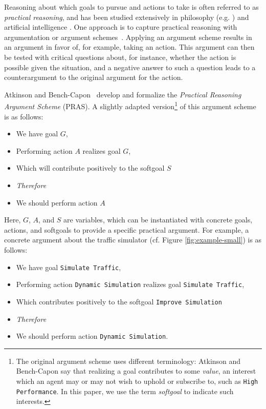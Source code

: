 Reasoning about which goals to pursue and actions to take is often referred to as \emph{practical reasoning}, and has been studied extensively in philosophy (e.g. \cite{Raz1978-RAZPR,walton1990}) and artificial intelligence \cite{bratman1987,atkinson2007}. One approach is to capture practical reasoning with argumentation or argument schemes~\cite{walton1990}. Applying an argument scheme results in an argument in favor of, for example, taking an action. This argument can then be tested with critical questions about, for instance, whether the action is possible given the situation, and a negative answer to such a question leads to a counterargument to the original argument for the action. 

Atkinson and Bench-Capon~\cite{atkinson2007} develop and formalize the \emph{Practical Reasoning Argument Scheme} (PRAS). A slightly adapted version\footnote{The original argument scheme uses different terminology: Atkinson and Bench-Capon say that realizing a goal contributes to some \emph{value}, an interest which an agent may or may not wish to uphold or subscribe to, such as \texttt{High Performance}. In this paper, we use the term \emph{softgoal} to indicate such interests.} of this argument scheme is as follows:

\begin{itemize}
\item[] We have goal $G$,
\item[] Performing action $A$ realizes goal $G$,
\item[] Which will contribute positively to the softgoal $S$
\item[] \textit{Therefore} 
\item[] We should perform action $A$
\end{itemize}

Here, $G$, $A$, and $S$ are variables, which can be instantiated with concrete goals, actions, and softgoals to provide a specific practical argument. For example, a concrete argument about the traffic simulator (cf. Figure \ref{fig:example-small}) is as follows: 
\begin{itemize}
\item[] We have goal \texttt{Simulate Traffic},
\item[] Performing action \texttt{Dynamic Simulation} realizes goal \texttt{Simulate Traffic}, 
\item[] Which contributes positively to the softgoal \texttt{Improve Simulation} 
\item[] \textit{Therefore} 
\item[] We should perform action \texttt{Dynamic Simulation}.
\end{itemize}

